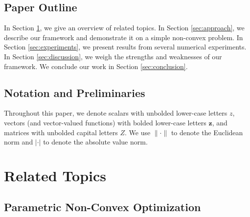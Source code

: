 \documentclass[10pt]{article} %
\theoremstyle{plain}
\theoremstyle{definition}
\theoremstyle{remark}
\begin{document}

\subsection{Paper Outline}

In Section \ref{sec:related-topics}, we give an overview of related topics. In Section \ref{sec:approach}, we describe our framework and demonstrate it on a simple non-convex problem. In Section \ref{sec:experiments}, we present results from several numerical experiments. In Section \ref{sec:discussion}, we weigh the strengths and weaknesses of our framework. We conclude our work in Section \ref{sec:conclusion}.

\subsection{Notation and Preliminaries}

Throughout this paper, we denote scalars with unbolded lower-case letters $z$, vectors (and vector-valued functions) with bolded lower-case letters $\mathbf{z}$, and matrices with unbolded capital letters $Z$. We use $\| \cdot \|$ to denote the Euclidean norm and $| \cdot |$ to denote the absolute value norm. 

\section{Related Topics} \label{sec:related-topics}

\subsection*{Parametric Non-Convex Optimization}
\end{document}
